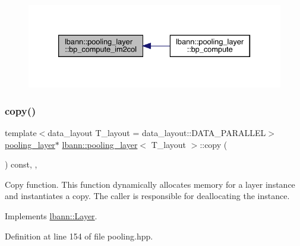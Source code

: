 \begin{figure}[H]
\begin{center}
\leavevmode
\includegraphics[width=333pt]{classlbann_1_1pooling__layer_a704aca0e1e5bba7d27b7755133e6d50b_icgraph}
\end{center}
\end{figure}
\mbox{\label{classlbann_1_1pooling__layer_a58f9e6223649bb79ad10a2411602d71d}} 
\subsubsection{\texorpdfstring{copy()}{copy()}}
{\footnotesize\ttfamily template$<$data\+\_\+layout T\+\_\+layout = data\+\_\+layout\+::\+D\+A\+T\+A\+\_\+\+P\+A\+R\+A\+L\+L\+EL$>$ \\
\hyperlink{classlbann_1_1pooling__layer}{pooling\+\_\+layer}$\ast$ \hyperlink{classlbann_1_1pooling__layer}{lbann\+::pooling\+\_\+layer}$<$ T\+\_\+layout $>$\+::copy (\begin{DoxyParamCaption}{ }\end{DoxyParamCaption}) const\hspace{0.3cm}{\ttfamily [inline]}, {\ttfamily [override]}, {\ttfamily [virtual]}}

Copy function. This function dynamically allocates memory for a layer instance and instantiates a copy. The caller is responsible for deallocating the instance. 

Implements \hyperlink{classlbann_1_1Layer_af420f22bbac801c85483ade84588a23f}{lbann\+::\+Layer}.



Definition at line 154 of file pooling.\+hpp.


